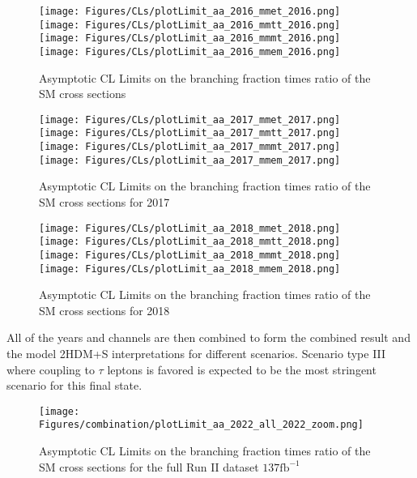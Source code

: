 \begin{figure}[ht!b]
  \centering
  \texttt{[image: Figures/CLs/plotLimit\_aa\_2016\_mmet\_2016.png]}
  \texttt{[image: Figures/CLs/plotLimit\_aa\_2016\_mmtt\_2016.png]}\\
  \texttt{[image: Figures/CLs/plotLimit\_aa\_2016\_mmmt\_2016.png]}
  \texttt{[image: Figures/CLs/plotLimit\_aa\_2016\_mmem\_2016.png]}\\
    \caption{\label{fig:CLs2016} Asymptotic CL Limits on the branching fraction times ratio of the SM cross sections}
\end{figure}

\begin{figure}[ht!b]
  \centering
  \texttt{[image: Figures/CLs/plotLimit\_aa\_2017\_mmet\_2017.png]}
  \texttt{[image: Figures/CLs/plotLimit\_aa\_2017\_mmtt\_2017.png]}\\
  \texttt{[image: Figures/CLs/plotLimit\_aa\_2017\_mmmt\_2017.png]}
  \texttt{[image: Figures/CLs/plotLimit\_aa\_2017\_mmem\_2017.png]}\\
    \caption{\label{fig:CLs2017} Asymptotic CL Limits on the branching fraction times ratio of the SM cross sections for 2017}
\end{figure}

\begin{figure}[ht!b]
  \centering
  \texttt{[image: Figures/CLs/plotLimit\_aa\_2018\_mmet\_2018.png]}
  \texttt{[image: Figures/CLs/plotLimit\_aa\_2018\_mmtt\_2018.png]}\\
  \texttt{[image: Figures/CLs/plotLimit\_aa\_2018\_mmmt\_2018.png]}
  \texttt{[image: Figures/CLs/plotLimit\_aa\_2018\_mmem\_2018.png]}\\
    \caption{\label{fig:CLs2018} Asymptotic CL Limits on the branching fraction times ratio of the SM cross sections for 2018}
\end{figure}

\clearpage

All of the years and channels are then combined to form the combined result and the model 2HDM+S interpretations for different scenarios. Scenario type III where coupling to $\tau$ leptons is favored is expected to be the most stringent scenario for this final state. 

\begin{figure}[ht!b]
  \texttt{[image: Figures/combination/plotLimit\_aa\_2022\_all\_2022\_zoom.png]}
    \caption{\label{fig:CLsRunII} Asymptotic CL Limits on the branching fraction times ratio of the SM cross sections for the full Run II dataset $\text{137}\text{fb}^{-1}$}
\end{figure}

